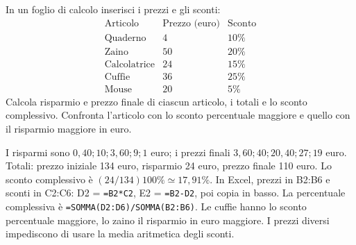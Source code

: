 
\begin{esercizio}
In un foglio di calcolo inserisci i prezzi e gli sconti:
\[
\begin{array}{c|rr}
\text{Articolo}&\text{Prezzo (euro)}&\text{Sconto}\\\hline
\text{Quaderno}&4&10\%\\\text{Zaino}&50&20\%\\
\text{Calcolatrice}&24&15\%\\\text{Cuffie}&36&25\%\\\text{Mouse}&20&5\%
\end{array}
\]
Calcola risparmio e prezzo finale di ciascun articolo, i totali e lo sconto complessivo.
Confronta l'articolo con lo sconto percentuale maggiore e quello con il risparmio maggiore in euro.
\end{esercizio}

\begin{soluzione}
I risparmi sono $0{,}40;10;3{,}60;9;1$ euro; i prezzi finali $3{,}60;40;20{,}40;27;19$ euro.
Totali: prezzo iniziale 134 euro, risparmio 24 euro, prezzo finale 110 euro.
Lo sconto complessivo è $(24/134)100\%\simeq17{,}91\%$.
In Excel, prezzi in B2:B6 e sconti in C2:C6: D2 = \texttt{=B2*C2}, E2 = \texttt{=B2-D2}, poi copia in basso.
La percentuale complessiva è \texttt{=SOMMA(D2:D6)/SOMMA(B2:B6)}.
Le cuffie hanno lo sconto percentuale maggiore, lo zaino il risparmio in euro maggiore.
I prezzi diversi impediscono di usare la media aritmetica degli sconti.
\end{soluzione}

